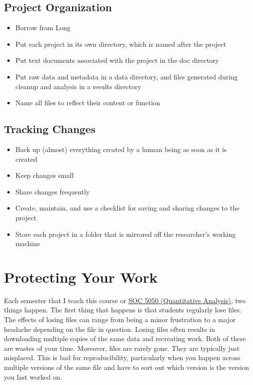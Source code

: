 \documentclass[]{book}
\providecommand{\tightlist}{%
  \setlength{\itemsep}{0pt}\setlength{\parskip}{0pt}}
\begin{document}
\section{Project Organization}\label{project-organization}

\begin{itemize}
\tightlist
\item
  Borrow from Long
\item
  Put each project in its own directory, which is named after the
  project
\item
  Put text documents associated with the project in the doc directory
\item
  Put raw data and metadata in a data directory, and files generated
  during cleanup and analysis in a results directory
\item
  Name all files to reflect their content or function
\end{itemize}

\section{Tracking Changes}\label{tracking-changes}

\begin{itemize}
\tightlist
\item
  Back up (almost) everything created by a human being as soon as it is
  created
\item
  Keep changes small
\item
  Share changes frequently
\item
  Create, maintain, and use a checklist for saving and sharing changes
  to the project
\item
  Store each project in a folder that is mirrored off the researcher's
  working machine
\end{itemize}

\chapter{Protecting Your Work}\label{protecting-your-work}

Each semester that I teach this course or
\href{https://slu-soc5050.github.io}{SOC 5050 (Quantitative Analysis)},
two things happen. The first thing that happens is that students
regularly lose files. The effects of losing files can range from being a
minor frustration to a major headache depending on the file in question.
Losing files often results in downloading multiple copies of the same
data and recreating work. Both of these are wastes of your time.
Moreover, files are rarely gone. They are typically just misplaced. This
is bad for reproducibility, particularly when you happen across multiple
versions of the same file and have to sort out which version is the
version you last worked on.
\end{document}
